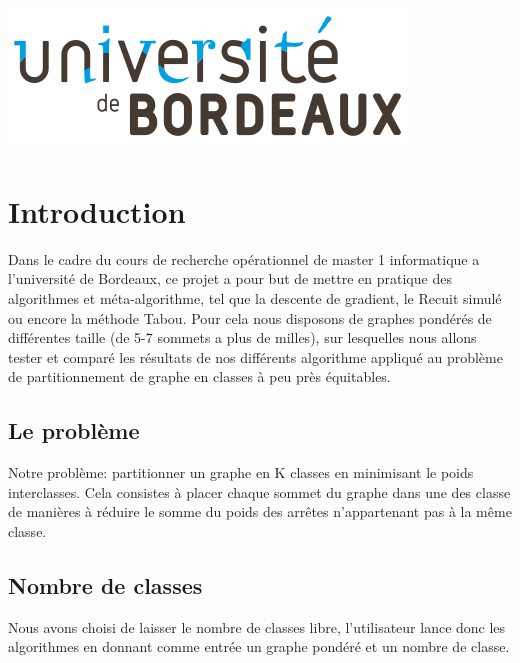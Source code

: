 \documentclass[a4paper]{article}
\begin{document}
\begin{titlepage}

\includegraphics{img/logo.png}\\[1cm]
 

\vfill
\end{titlepage}

\tableofcontents

\newpage
\section{Introduction}

Dans le cadre du cours de recherche opérationnel de master 1 informatique a l'université de Bordeaux, ce projet a pour but de mettre en pratique des algorithmes et méta-algorithme, tel que la descente de gradient, le Recuit simulé ou encore la méthode Tabou. Pour cela nous disposons de graphes pondérés de différentes taille (de 5-7 sommets a plus de milles), sur lesquelles nous allons tester et comparé les résultats de nos différents algorithme appliqué au problème de partitionnement de graphe en classes à peu près équitables.

\subsection{Le problème}
Notre problème: partitionner un graphe en K classes en minimisant le poids interclasses. Cela consistes à placer chaque sommet du graphe dans une des classe de manières à réduire le somme du poids des arrêtes n'appartenant pas à la même classe.

\subsection{Nombre de classes}
Nous avons choisi de laisser le nombre de classes libre, l'utilisateur lance donc les algorithmes en donnant comme entrée un graphe pondéré et un nombre de classe. 
\end{document}
